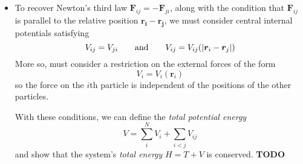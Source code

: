 \documentclass[11pt, a4paper]{article}
\newcommand{\eqtext}[1]{\qquad \text{#1} \qquad}
\begin{document}
\begin{itemize}
	\item To recover Newton's third law $ \bm{F}_{ij} = - \bm{F}_{ji} $, along with the condition that $ \bm{F}_{ij} $ is parallel to the relative position $ \bm{\bm{r}_{i} - \bm{r}_{j}} $, we must consider central internal potentials satisfying 
	\begin{equation*}
		 V_{ij} = V_{ji} \eqtext{and} V_{ij} = V_{ij}(\abs{\bm{r}_{i} - \bm{r}_{j}})
	\end{equation*}
	More so, must consider a restriction on the external forces of the form
	\begin{equation*}
		V_{i} = V_{i}(\bm{r}_{i})
	\end{equation*}
	so the force on the $ i $th particle is independent of the positions of the other particles.
	
	With these conditions, we can define the \textit{total potential energy}
	\begin{equation*}
		V = \sum_{i}^{N}V_{i} + \sum_{i < j}V_{ij}
	\end{equation*}
	and show that the system's \textit{total energy} $ H = T + V $ is conserved. \textbf{TODO}
\end{itemize}
\end{document}
